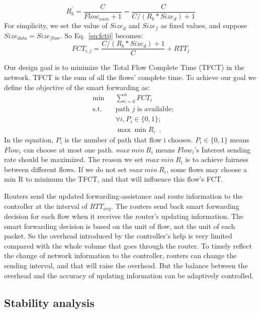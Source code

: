 \begin{equation}
R^{'}_{b}=\frac{C}{Flow_{num}+1} = \frac{C}{C/(R_{b}\ast{Size_{d}})+1}
\end{equation}
For simplicity, we set the value of $Size_{d}$ and $Size_{f}$ as fixed values, and suppose $Size_{data} =Size_{flow}$. So Eq.~\ref{eq:fctij} becomes:
\begin{equation}
FCT_{i,j}=\frac{C/(R_{b}*Size_{d})+1}{C}+RTT_j
\end{equation}

Our design goal is to minimize the Total Flow Complete Time (TFCT) in the network. TFCT is the sum of all the flows' complete time. To achieve our goal we define the objective of the smart forwarding as:
\begin{equation}
	\begin{aligned}
		& \min &&  \sum_{i=0}^{n} FCT_i \\
		& \text{s.t.}  && \text{path } j \text{ is available};\\
		&              && \forall i, P_i \in \{0,1\};\\
		&              && \max \min  R_i \enspace .
	\end{aligned}
\end{equation}
In the equation, $P_i$ is the number of path that flow i chooses. $P_i \in \{0,1\}$ means $Flow_i$ can choose at most one path. $max \ min \ R_i$ means $Flow_{i}$'s Interest sending rate should be maximized. The reason we set $max \ min \ R_i$ is to achieve fairness between different flows. If we do not set $max \ min \ R_i$, some flows may choose a min R to minimum the TFCT, and that will influence this flow's FCT. 

Routers send the updated forwarding-assistance and route information to the controller at the interval of $RTT_{avg}$. The routers send back smart forwarding decision for each flow when it receives the router's updating information. The smart forwarding decision is based on the unit of flow, not the unit of each packet. So the overhead introduced by the controller's help is very limited compared with the whole volume that goes through the router. To timely reflect the change of network information to the controller, routers can change the sending interval, and that will raise the overhead. But the balance between the overhead and the accuracy of updating information can be adaptively controlled.

\subsection{Stability analysis}

